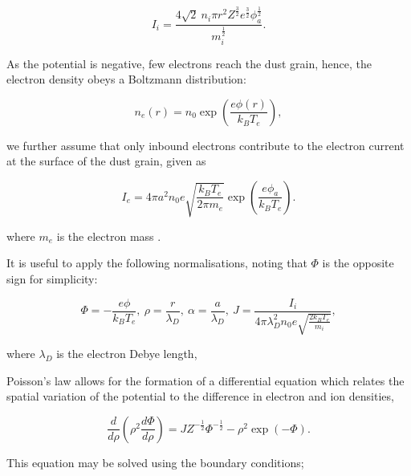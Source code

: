 \documentclass{article}
\begin{document}
\begin{equation}\label{eq:ABRIi}
I_i = \frac{4\sqrt{2} \ n_i \pi r^2 Z^{\frac{3}{2}}e^{\frac{3}{2}} \phi_a^{\frac{1}{2}} } {m_i^{\frac{1}{2}}}.
\end{equation}

As the potential is negative, few electrons reach the dust grain, hence, the electron density obeys a Boltzmann
distribution:

\begin{equation}\label{eq:ABRed}
n_e(r) = n_0 \exp{\left(\frac{e\phi(r)}{k_B T_e}\right)},
\end{equation}

\smallskip

we further assume that only inbound electrons contribute to the electron current at the surface of the dust
grain, given as

\begin{equation}\label{eq:ABRIe}
I_e = 4 \pi a^2 n_0 e \sqrt{\frac{k_B T_e}{2 \pi m_e }} \exp{\left(\frac{e \phi_a}{k_B T_e}\right)}.
\end{equation}  

\noindent where $m_e$ is the electron mass \cite{ABR}.

\medskip

It is useful to apply the following normalisations, noting that $\Phi$ is the opposite
sign for simplicity:

\begin{equation}\label{eq:ABRnorm}
{\Phi = - \frac{e\phi}{k_B T_e}}, \ {\rho = \frac{r}{\lambda_D}},\ {\alpha = \frac{a}{\lambda_D}},\ {J = \frac{I_i}{4 \pi \lambda_D^2 n_0 e \sqrt{\frac{2k_B T_e}{m_i}}}},
\end{equation}
    
\noindent where $\lambda_D$ is the electron Debye length, 

\medskip

Poisson's law allows for the formation of a differential equation which relates
the spatial variation of the potential to the difference in electron and 
ion densities,

\begin{equation}\label{eq:ABR9} 
\frac{d}{d\rho} \left(\rho^2 \frac{d\Phi}{d\rho}\right) = J Z^{-\frac{1}{2}}\Phi^{-\frac{1}{2}}  - \rho^2 \exp{(-\Phi)}.
\end{equation}

\medskip

\noindent This equation may be solved using the boundary conditions;
\end{document}
